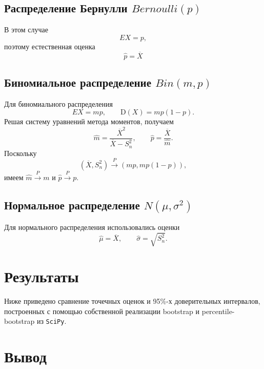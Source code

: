 \documentclass[a4paper,14pt]{extarticle}
\begin{document}
\subsection[Распределение Бернулли Bernoulli(p)]{Распределение Бернулли \(Bernoulli(p)\)}

В этом случае
\[
EX = p,
\]
поэтому естественная оценка
\[
\widehat{p} = \overline{X}
\]

\subsection[Биномиальное распределение Bin(m,p)]{Биномиальное распределение \(Bin(m,p)\)}

Для биномиального распределения
\[
EX = mp,
\qquad
\mathrm{D}(X)=mp(1-p).
\]
Решая систему уравнений метода моментов, получаем
\[
\widehat{m} = \frac{\overline{X}^{2}}{\overline{X} - S_n^2},
\qquad
\widehat{p} = \frac{\overline{X}}{\widehat{m}}.
\]
Поскольку
\[
(\overline{X}, S_n^2) \xrightarrow{P} (mp, mp(1-p)),
\]
имеем \(\widehat{m} \xrightarrow{P} m\) и \(\widehat{p} \xrightarrow{P} p\). 

\subsection[Нормальное распределение N(mu,sigma^2)]{Нормальное распределение \(N(\mu,\sigma^2)\)}

Для нормального распределения использовались оценки
\[
\widehat{\mu} = \overline{X},
\qquad
\widehat{\sigma} = \sqrt{S_n^2}.
\]

\section{Результаты}

Ниже приведено сравнение точечных оценок и 95\%-х доверительных интервалов, построенных с помощью собственной реализации bootstrap и percentile-bootstrap из \texttt{SciPy}.

\begingroup
{}
\scriptsize
\setlength{\tabcolsep}{2pt}

\endgroup

\begingroup
{}
\scriptsize
\setlength{\tabcolsep}{2pt}

\endgroup

\section{Вывод}
\end{document}
